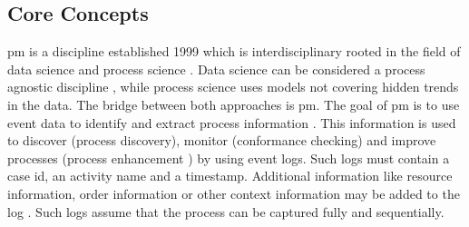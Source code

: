 \subsection{Core Concepts}
\label{sec:core-concepts}
\gls{pm} is a discipline established 1999 which is interdisciplinary rooted in the field of data science and process science \autocite{van2016data}. Data science can be considered a process agnostic discipline \autocite{van2016data}, while process science uses models not covering hidden trends in the data. The bridge between both approaches is \gls{pm}. The goal of \gls{pm} is to use event data to identify and extract process information \autocite{vanderAalst2012}. This information is used to discover (process discovery), monitor (conformance checking) and improve processes (process enhancement \autocite{vanderAalst2012}) by using event logs. Such logs must contain a case \gls{id}, an activity name and a timestamp. Additional information like resource information, order information or other context information may be added to the log \autocite{vanderAalst2012}. Such logs assume that the process can be captured fully and sequentially.


